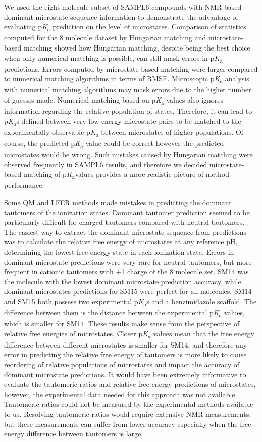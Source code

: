 \documentclass[9pt,lineno,final]{elife}
\newcommand{\pKa}{p\textit{K}\textsubscript{a}}
\begin{document}
We used the eight molecule subset of SAMPL6 compounds with NMR-based dominant microstate sequence information to demonstrate the advantage of evaluating \pKa{} prediction on the level of microstates.
Comparison of statistics computed for the 8 molecule dataset by Hungarian matching and microstate-based matching showed how Hungarian matching, despite being the best choice when only numerical matching is possible, can still mask errors in \pKa{} predictions. 
Errors computed by microstate-based matching were larger compared to numerical matching algorithms in terms of RMSE.
Microscopic \pKa{} analysis with numerical matching algorithms may mask errors due to the higher number of guesses made.
Numerical matching based on \pKa{} values also ignores information regarding the relative population of states. 
Therefore, it can lead to \pKa{}s defined between very low energy microstate pairs to be matched to the experimentally observable \pKa{} between microstates of higher populations. 
Of course, the predicted \pKa{} value could be correct however the predicted microstates would be wrong. 
Such mistakes caused by Hungarian matching were observed frequently in SAMPL6 results, and therefore we decided microstate-based matching of \pKa values provides a more realistic picture of method performance.  

Some QM and LFER methods made mistakes in predicting the dominant tautomers of the ionization states. 
Dominant tautomer prediction seemed to be particularly difficult for charged tautomers compared with neutral tautomers. 
The easiest way to extract the dominant microstate sequence from predictions was to calculate the relative free energy of microstates at any reference pH, determining the lowest free energy state in each ionization state.
Errors in dominant microstate predictions were very rare for neutral tautomers, but more frequent in cationic tautomers with +1 charge of the 8 molecule set. 
SM14 was the molecule with the lowest dominant microstate prediction accuracy, while dominant microstates predictions for SM15 were perfect for all molecules. 
SM14 and SM15 both possess two experimental \pKa{}s and a benzimidazole scaffold. 
The difference between them is the distance between the experimental \pKa{} values, which is smaller for SM14. 
These results make sense from the perspective of relative free energies of microstates. 
Closer \pKa{} values mean that the free energy difference between different microstates is smaller for SM14, and therefore any error in predicting the relative free energy of tautomers is more likely to cause reordering of relative populations of microstates and impact the accuracy of dominant microstate predictions. 
It would have been extremely informative to evaluate the tautomeric ratios and relative free energy predictions of microstates, however, the experimental data needed for this approach was not available. 
Tautomeric ratios could not be measured by the experimental methods available to us. 
Resolving tautomeric ratios would require extensive NMR measurements, but these measurements can suffer from lower accuracy especially when the free energy difference between tautomers is large.
\end{document}
